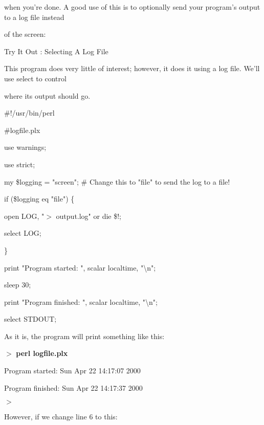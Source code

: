 \documentclass[a4paper,11pt]{book}
\begin{document}
\noindent when you're done.  A  good use  of this  is  to  optionally  send  your  program's  output to  a  log file instead

\noindent of the screen:

\noindent 

\noindent Try It Out : Selecting A Log File

\noindent 

\noindent This program does very little of interest; however, it does it using a log file. We'll use select to control

\noindent where its output should go.

\noindent 

\noindent \#!/usr/bin/perl

\noindent \#logfile.plx

\noindent use warnings;

\noindent use strict;

\noindent 

\noindent my \$logging = "screen"; \# Change this to "file" to send the log to a file!

\noindent 

\noindent if (\$logging eq "file") \{

\noindent open LOG, "$>$ output.log" or die \$!;

\noindent select LOG;

\noindent \}

\noindent 

\noindent print "Program started: ", scalar localtime, "\textbackslash n";

\noindent sleep 30;

\noindent print "Program finished: ", scalar localtime, "\textbackslash n";

\noindent 

\noindent select STDOUT;

\noindent 

\noindent 

\noindent As it is, the program will print something like this:

\noindent 

\noindent $>$ \textbf{perl logfile.plx}

\noindent Program started: Sun Apr 22 14:17:07 2000

\noindent Program finished: Sun Apr 22 14:17:37 2000

\noindent $>$

\noindent 

\noindent However, if we change line 6 to this:
\end{document}
